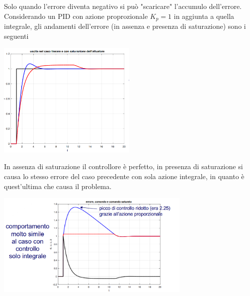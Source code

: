 \documentclass[10pt, letterpaper]{report}
\begin{document}
Solo quando l'errore diventa negativo si può "scaricare" l'accumulo dell'errore.\acc
Considerando un PID con azione proprozionale $K_p=1$ in aggiunta a quella integrale, gli andamenti dell'errore (in assenza e presenza di saturazione) sono i seguenti
\begin{center}
    \includegraphics[width=0.5\textwidth]{images/saturazioneCurve.pdf.png}
\end{center}
In assenza di saturazione il controllore è perfetto, in presenza di saturazione si causa lo stesso errore del caso precedente con sola azione integrale, in quanto è quest'ultima che causa il problema.
\begin{center}
    \includegraphics[width=0.7\textwidth]{images/saturazioneCurve3.png}
\end{center}
\end{document}
